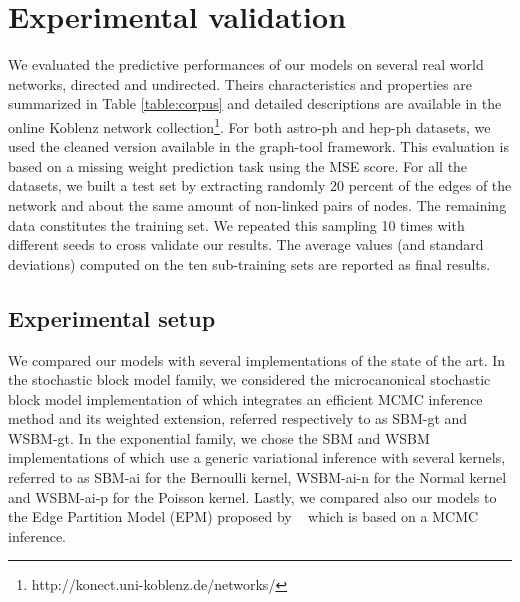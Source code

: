 \section{Experimental validation}
\label{sec:exps}

We evaluated the predictive performances of our models on several real world networks, directed and undirected. Theirs characteristics and properties are summarized in Table \ref{table:corpus} and detailed descriptions are available in the online Koblenz network collection\footnote{http://konect.uni-koblenz.de/networks/}. For both astro-ph and hep-ph datasets, we used the cleaned version available in the  graph-tool framework.
This evaluation is based on a missing weight prediction task using the MSE score. 
For all the datasets, we built a test set by extracting randomly 20 percent of the edges of the network and about the same amount of non-linked pairs of nodes. The remaining data constitutes the training set. We repeated this sampling 10 times with different seeds to cross validate our results. The average values (and standard deviations) computed on the ten sub-training sets are reported as final results.

\begin{table*}[t]
\bgroup
\def\arraystretch{1} %
	
\egroup
\label{table:corpus}
\end{table*}

\subsection{Experimental setup}


We compared our models with several implementations of the state of the art. In the stochastic block model family, we considered the microcanonical stochastic block model implementation of \cite{peixoto2018nonparametric} which integrates an efficient MCMC inference method and its weighted extension, referred respectively to as SBM-gt and WSBM-gt. In the exponential family, we chose the SBM and WSBM implementations of \cite{aicher2014learning} which use a generic variational inference with several kernels, referred to as SBM-ai for the Bernoulli kernel, WSBM-ai-n for the Normal kernel and WSBM-ai-p for the Poisson kernel. Lastly, we compared also our models to the Edge Partition Model (EPM) proposed by ~\cite{zhou2015} which is based on a MCMC inference.


